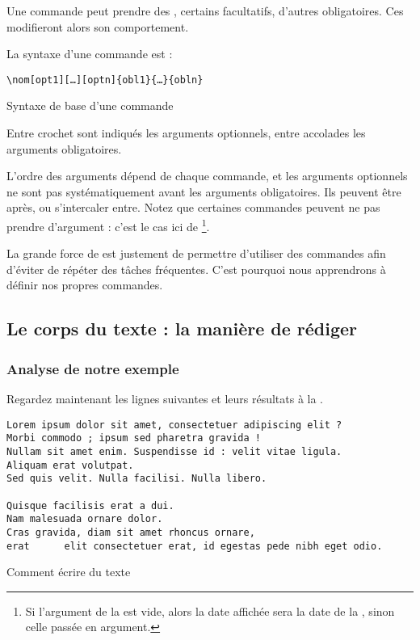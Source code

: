 Une commande peut prendre des , certains facultatifs, d'autres obligatoires. Ces  modifieront alors son comportement.

La syntaxe d'une commande est :


\begin{listing}[ht]

\begin{verbatim}
\nom[opt1][…][optn]{obl1}{…}{obln}
\end{verbatim}
\caption{Syntaxe de base d'une commande}
\end{listing}

Entre crochet sont indiqués les arguments optionnels, entre accolades les arguments obligatoires.


L'ordre des arguments dépend de chaque commande, et les arguments optionnels ne sont pas systématiquement avant les arguments obligatoires. Ils peuvent être après, ou s'intercaler entre. Notez que certaines commandes peuvent ne pas prendre d'argument : c'est le cas ici de \footnote{Si l'argument de la   est vide, alors la date affichée  sera la date de la , sinon celle passée en argument.}.

La grande force de \logiciel{\LaTeX} est justement de permettre d'utiliser des commandes afin d'éviter de répéter des tâches fréquentes. C'est pourquoi nous apprendrons à définir nos propres commandes.



\subsection{Le corps du texte : la manière de rédiger}

\subsubsection{Analyse de notre exemple}
Regardez maintenant les lignes suivantes et leurs résultats à la .

\begin{listing}[ht]
\begin{verbatim}
Lorem ipsum dolor sit amet, consectetuer adipiscing elit ?
Morbi commodo ; ipsum sed pharetra gravida !
Nullam sit amet enim. Suspendisse id : velit vitae ligula.
Aliquam erat volutpat.
Sed quis velit. Nulla facilisi. Nulla libero. 

Quisque facilisis erat a dui.
Nam malesuada ornare dolor.
Cras gravida, diam sit amet rhoncus ornare, 
erat      elit consectetuer erat, id egestas pede nibh eget odio.
\end{verbatim}
\caption{Comment écrire du texte}
\end{listing}

